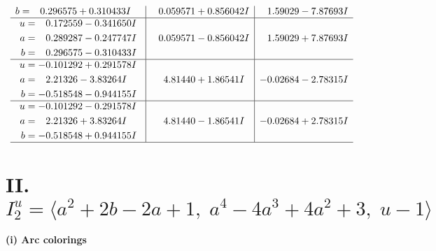 \documentclass[1p]{elsarticle_modified}
\theoremstyle{definition}
\begin{document}
$$\begin{array}{c|c|c}
\begin{aligned}
b &= \phantom{-}0.296575 + 0.310433 I\end{aligned}
 & \phantom{-}0.059571 + 0.856042 I & \phantom{-}1.59029 - 7.87693 I \\ \hline\begin{aligned}
u &= \phantom{-}0.172559 - 0.341650 I \\
a &= \phantom{-}0.289287 - 0.247747 I \\
b &= \phantom{-}0.296575 - 0.310433 I\end{aligned}
 & \phantom{-}0.059571 - 0.856042 I & \phantom{-}1.59029 + 7.87693 I \\ \hline\begin{aligned}
u &= -0.101292 + 0.291578 I \\
a &= \phantom{-}2.21326 - 3.83264 I \\
b &= -0.518548 - 0.944155 I\end{aligned}
 & \phantom{-}4.81440 + 1.86541 I & -0.02684 - 2.78315 I \\ \hline\begin{aligned}
u &= -0.101292 - 0.291578 I \\
a &= \phantom{-}2.21326 + 3.83264 I \\
b &= -0.518548 + 0.944155 I\end{aligned}
 & \phantom{-}4.81440 - 1.86541 I & -0.02684 + 2.78315 I\\
 \hline 
 \end{array}$$\newpage\newpage\renewcommand{\arraystretch}{1}
\centering \section*{II. $I^u_{2}= \langle a^2+2 b-2 a+1,\;a^4-4 a^3+4 a^2+3,\;u-1 \rangle$}
\flushleft \textbf{(i) Arc colorings}\\
\end{document}
